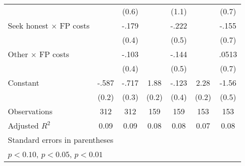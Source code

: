 \begin{table}[htbp]
\begin{tabular}{l*{6}{c}}
                &                  &    (0.6)         &                  &    (1.1)         &                  &    (0.7)         \\
Seek honest $\times$ FP costs&                  &    -.179         &                  &    -.222         &                  &    -.155         \\
                &                  &    (0.4)         &                  &    (0.5)         &                  &    (0.7)         \\
Other $\times$ FP costs&                  &    -.103         &                  &    -.144         &                  &    .0513         \\
                &                  &    (0.4)         &                  &    (0.5)         &                  &    (0.7)         \\
Constant        &    -.587\sym{**} &    -.717\sym{**} &     1.88\sym{***}&    -.123         &     2.28\sym{***}&    -1.56\sym{***}\\
                &    (0.2)         &    (0.3)         &    (0.2)         &    (0.4)         &    (0.2)         &    (0.5)         \\
\hline
Observations    &      312         &      312         &      159         &      159         &      153         &      153         \\
Adjusted \(R^{2}\)&     0.09         &     0.09         &     0.08         &     0.08         &     0.07         &     0.08         \\
\hline\hline
\multicolumn{7}{l}{\footnotesize Standard errors in parentheses}\\
\multicolumn{7}{l}{\footnotesize \sym{*} \(p<0.10\), \sym{**} \(p<0.05\), \sym{***} \(p<0.01\)}\\
\end{tabular}
\end{table}
